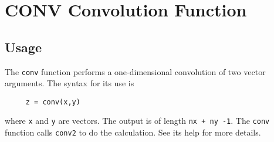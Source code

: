 \section{CONV Convolution Function}

\subsection{Usage}

The \verb|conv| function performs a one-dimensional convolution of two
vector arguments.  The syntax for its use is
\begin{verbatim}
     z = conv(x,y)
\end{verbatim}
where \verb|x| and \verb|y| are vectors.  The output is of length \verb|nx + ny -1|.
The \verb|conv| function calls \verb|conv2| to do the calculation.  See its
help for more details.
